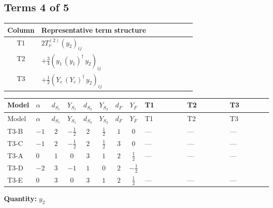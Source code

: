 \documentclass[8pt]{article}
\begin{document}
\begin{landscape}
\subsection*{Terms 4 of 5}
\begin{center}
\begin{tabular}{@{}c >{\raggedright\arraybackslash}p{0.82\linewidth}@{}}
\toprule
Column & Representative term structure \\
\midrule
T1 & \(\displaystyle 2 T_{\nu}^{(2)} \left({y_2}\right)_{ij}\) \\
\midrule
T2 & \(\displaystyle +\frac{3}{4} \left({y_1}\,\left({y_1}\right)^{\dagger}\,{y_2}\right)_{ij}\) \\
\midrule
T3 & \(\displaystyle +\frac{1}{2} \left({Y_e}\,\left({Y_e}\right)^{\dagger}\,{y_2}\right)_{ij}\) \\
\midrule
\bottomrule
\end{tabular}
\end{center}
\smallskip
\tiny
\begin{longtable}{@{}llcccccc >{\raggedright\arraybackslash}p{0.21\linewidth} >{\raggedright\arraybackslash}p{0.21\linewidth} >{\raggedright\arraybackslash}p{0.21\linewidth}@{}}
\toprule
Model & $\alpha$ & $d_{S_1}$ & $Y_{S_1}$ & $d_{S_2}$ & $Y_{S_2}$ & $d_F$ & $Y_F$ & T1 & T2 & T3 \\
\midrule
\endfirsthead
\toprule
Model & $\alpha$ & $d_{S_1}$ & $Y_{S_1}$ & $d_{S_2}$ & $Y_{S_2}$ & $d_F$ & $Y_F$ & T1 & T2 & T3 \\
\midrule
\endhead
T3-B & $-1$ & $2$ & $-\frac{1}{2}$ & $2$ & $\frac{1}{2}$ & $1$ & $0$ & --- & --- & --- \\
\midrule
T3-C & $-1$ & $2$ & $-\frac{1}{2}$ & $2$ & $\frac{1}{2}$ & $3$ & $0$ & --- & --- & --- \\
\midrule
T3-A & $0$ & $1$ & $0$ & $3$ & $1$ & $2$ & $\frac{1}{2}$ & --- & --- & --- \\
\midrule
T3-D & $-2$ & $3$ & $-1$ & $1$ & $0$ & $2$ & $-\frac{1}{2}$ & \scriptsize\adjustbox{max width=\linewidth}{$\begin{gathered} 2 T_{\nu}^{(2)} \left({y_2}\right)_{ij}\end{gathered}$} & \scriptsize\adjustbox{max width=\linewidth}{$\begin{gathered} +\frac{3}{4} \left({y_1}\,\left({y_1}\right)^{\dagger}\,{y_2}\right)_{ij}\end{gathered}$} & \scriptsize\adjustbox{max width=\linewidth}{$\begin{gathered} +\frac{1}{2} \left({Y_e}\,\left({Y_e}\right)^{\dagger}\,{y_2}\right)_{ij}\end{gathered}$} \\
\midrule
T3-E & $0$ & $3$ & $0$ & $3$ & $1$ & $2$ & $\frac{1}{2}$ & --- & --- & --- \\
\midrule
\bottomrule
\end{longtable}
\clearpage
\noindent\textbf{Quantity: }$y_2$\par\smallskip

\end{landscape}
\end{document}
